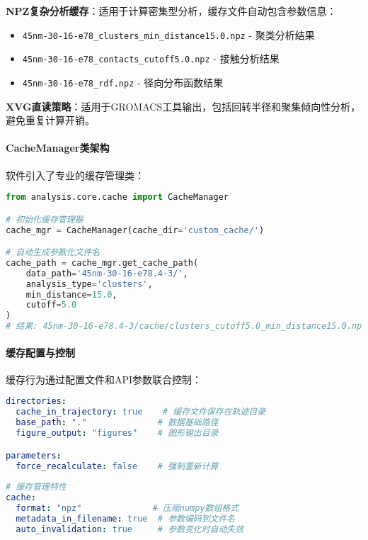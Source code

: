 \textbf{NPZ复杂分析缓存}：适用于计算密集型分析，缓存文件自动包含参数信息：
\begin{itemize}
    \item \lstinline|45nm-30-16-e78_clusters_min_distance15.0.npz| - 聚类分析结果
    \item \lstinline|45nm-30-16-e78_contacts_cutoff5.0.npz| - 接触分析结果  
    \item \lstinline|45nm-30-16-e78_rdf.npz| - 径向分布函数结果
\end{itemize}

\textbf{XVG直读策略}：适用于GROMACS工具输出，包括回转半径和聚集倾向性分析，避免重复计算开销。

\paragraph{CacheManager类架构}

软件引入了专业的缓存管理类：

\begin{lstlisting}[language=python,style=blockstyle]
from analysis.core.cache import CacheManager

# 初始化缓存管理器
cache_mgr = CacheManager(cache_dir='custom_cache/')

# 自动生成参数化文件名
cache_path = cache_mgr.get_cache_path(
    data_path='45nm-30-16-e78.4-3/',
    analysis_type='clusters',
    min_distance=15.0,
    cutoff=5.0
)
# 结果: 45nm-30-16-e78.4-3/cache/clusters_cutoff5.0_min_distance15.0.npz
\end{lstlisting}

\paragraph{缓存配置与控制}

缓存行为通过配置文件和API参数联合控制：

\begin{lstlisting}[language=yaml,style=blockstyle]
directories:
  cache_in_trajectory: true    # 缓存文件保存在轨迹目录
  base_path: "."              # 数据基础路径
  figure_output: "figures"    # 图形输出目录

parameters:
  force_recalculate: false    # 强制重新计算
  
# 缓存管理特性
cache:
  format: "npz"              # 压缩numpy数组格式
  metadata_in_filename: true  # 参数编码到文件名
  auto_invalidation: true     # 参数变化时自动失效
\end{lstlisting}

